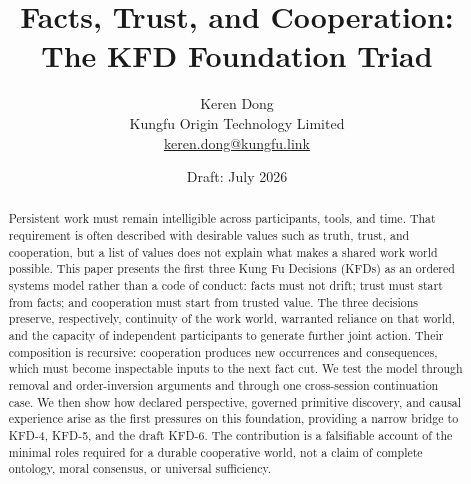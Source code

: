 \documentclass[11pt]{article}
\title{Facts, Trust, and Cooperation:\\
The KFD Foundation Triad}
\author{Keren Dong\\Kungfu Origin Technology Limited\\\href{mailto:keren.dong@kungfu.link}{keren.dong@kungfu.link}}
\date{Draft: July 2026}
\begin{document}
\maketitle

\begin{abstract}
Persistent work must remain intelligible across participants, tools, and time.
That requirement is often described with desirable values such as truth,
trust, and cooperation, but a list of values does not explain what makes a
shared work world possible. This paper presents the first three Kung Fu
Decisions (KFDs) as an ordered systems model rather than a code of conduct:
facts must not drift; trust must start from facts; and cooperation must start
from trusted value. The three decisions preserve, respectively, continuity of
the work world, warranted reliance on that world, and the capacity of
independent participants to generate further joint action. Their composition
is recursive: cooperation produces new occurrences and consequences, which
must become inspectable inputs to the next fact cut. We test the model through
removal and order-inversion arguments and through one cross-session
continuation case. We then show how declared perspective, governed primitive
discovery, and causal experience arise as the first pressures on this
foundation, providing a narrow bridge to KFD-4, KFD-5, and the draft KFD-6.
The contribution is a falsifiable account of the minimal roles required for a
durable cooperative world, not a claim of complete ontology, moral consensus,
or universal sufficiency.
\end{abstract}













\end{document}
